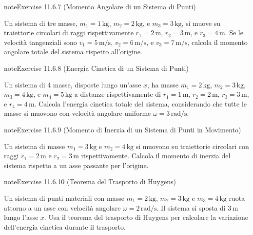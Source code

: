 \documentclass[letterpaper,10pt,italian]{jupyterBook}
\begin{document}
\begin{sphinxadmonition}{note}{Exercise 11.6.7 (Momento Angolare di un Sistema di Punti)}



\sphinxAtStartPar
Un sistema di tre masse, \(m_1 = 1 \, \text{kg}\), \(m_2 = 2 \, \text{kg}\), e \(m_3 = 3 \, \text{kg}\), si muove su traiettorie circolari di raggi rispettivamente \(r_1 = 2 \, \text{m}\), \(r_2 = 3 \, \text{m}\), e \(r_3 = 4 \, \text{m}\). Se le velocità tangenziali sono \(v_1 = 5 \, \text{m/s}\), \(v_2 = 6 \, \text{m/s}\), e \(v_3 = 7 \, \text{m/s}\), calcola il momento angolare totale del sistema rispetto all’origine.
\end{sphinxadmonition}
 \label{exercise:ch/mechanics/inertia-problems-exercise-7}

\begin{sphinxadmonition}{note}{Exercise 11.6.8 (Energia Cinetica di un Sistema di Punti)}



\sphinxAtStartPar
Un sistema di 4 masse, disposte lungo un’asse \(x\), ha masse \(m_1 = 2 \, \text{kg}\), \(m_2 = 3 \, \text{kg}\), \(m_3 = 4 \, \text{kg}\), e \(m_4 = 5 \, \text{kg}\) a distanze rispettivamente di \(r_1 = 1 \, \text{m}\), \(r_2 = 2 \, \text{m}\), \(r_3 = 3 \, \text{m}\), e \(r_4 = 4 \, \text{m}\). Calcola l’energia cinetica totale del sistema, considerando che tutte le masse si muovono con velocità angolare uniforme \(\omega = 3 \, \text{rad/s}\).
\end{sphinxadmonition}
 \label{exercise:ch/mechanics/inertia-problems-exercise-8}

\begin{sphinxadmonition}{note}{Exercise 11.6.9 (Momento di Inerzia di un Sistema di Punti in Movimento)}



\sphinxAtStartPar
Un sistema di masse \(m_1 = 3 \, \text{kg}\) e \(m_2 = 4 \, \text{kg}\) si muovono su traiettorie circolari con raggi \(r_1 = 2 \, \text{m}\) e \(r_2 = 3 \, \text{m}\) rispettivamente. Calcola il momento di inerzia del sistema rispetto a un asse passante per l’origine.
\end{sphinxadmonition}
 \label{exercise:ch/mechanics/inertia-problems-exercise-9}

\begin{sphinxadmonition}{note}{Exercise 11.6.10 (Teorema del Trasporto di Huygens)}



\sphinxAtStartPar
Un sistema di punti materiali con masse \(m_1 = 2 \, \text{kg}\), \(m_2 = 3 \, \text{kg}\) e \(m_3 = 4 \, \text{kg}\) ruota attorno a un asse con velocità angolare \(\omega = 2 \, \text{rad/s}\). Il sistema si sposta di \(3 \, \text{m}\) lungo l’asse \(x\). Usa il teorema del trasporto di Huygens per calcolare la variazione dell’energia cinetica durante il trasporto.
\end{sphinxadmonition}
\end{document}

